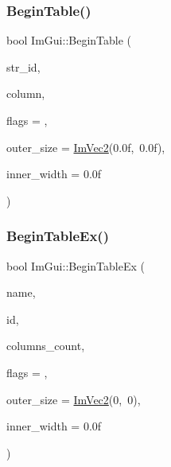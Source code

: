 \mbox{\label{namespaceImGui_a04ee4f6866b8e10b98008e7f19d35796}} 
\subsubsection{\texorpdfstring{Begin\+Table()}{BeginTable()}}
{\footnotesize\ttfamily bool Im\+Gui\+::\+Begin\+Table (\begin{DoxyParamCaption}\item[{const char $\ast$}]{str\+\_\+id,  }\item[{int}]{column,  }\item[{Im\+Gui\+Table\+Flags}]{flags = {},  }\item[{const \hyperlink{structImVec2}{Im\+Vec2} \&}]{outer\+\_\+size = {\ttfamily \hyperlink{structImVec2}{Im\+Vec2}(0.0f,~0.0f)},  }\item[{float}]{inner\+\_\+width = {\ttfamily 0.0f} }\end{DoxyParamCaption})}

\mbox{\label{namespaceImGui_a28046a30716afeb7738a82a5b19044ca}} 
\subsubsection{\texorpdfstring{Begin\+Table\+Ex()}{BeginTableEx()}}
{\footnotesize\ttfamily bool Im\+Gui\+::\+Begin\+Table\+Ex (\begin{DoxyParamCaption}\item[{const char $\ast$}]{name,  }\item[{Im\+Gui\+ID}]{id,  }\item[{int}]{columns\+\_\+count,  }\item[{Im\+Gui\+Table\+Flags}]{flags = {},  }\item[{const \hyperlink{structImVec2}{Im\+Vec2} \&}]{outer\+\_\+size = {\ttfamily \hyperlink{structImVec2}{Im\+Vec2}(0,~0)},  }\item[{float}]{inner\+\_\+width = {\ttfamily 0.0f} }\end{DoxyParamCaption})}

\mbox{\label{namespaceImGui_a36816a48385f4759d746a03cf6202512}} 
